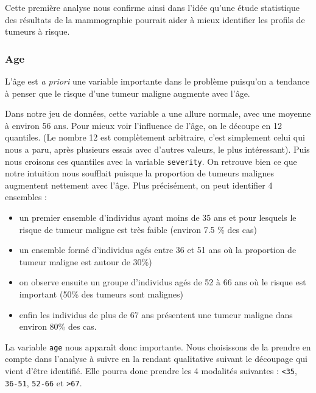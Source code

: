 \documentclass[a4paper]{report}
\begin{document}
Cette première analyse nous confirme ainsi dans l'idée qu'une étude statistique des résultats de la mammographie pourrait aider à mieux identifier les profils de tumeurs à risque.


\subsubsection{Age}
L'âge est \emph{a priori} une variable importante dans le problème puisqu'on a tendance à penser que le risque d'une tumeur maligne augmente avec l'âge.

Dans notre jeu de données, cette variable a une allure normale, avec une moyenne à environ 56 ans. Pour mieux voir l'influence de l'âge, on le découpe en 12 quantiles. (Le nombre 12 est complètement arbitraire, c'est simplement celui qui nous a paru, après plusieurs essais avec d'autres valeurs, le plus intéressant). Puis nous croisons ces quantiles avec la variable \verb|severity|. On retrouve bien ce que notre intuition nous soufflait puisque la proportion de tumeurs malignes augmentent nettement avec l'âge. Plus précisément, on peut identifier 4 ensembles :
\begin{itemize}
\item un premier ensemble d'individus ayant moins de 35 ans et pour lesquels le risque de tumeur maligne est très faible (environ 7.5 \% des cas)
\item un ensemble formé d'individus agés entre 36 et 51 ans où la proportion de tumeur maligne est autour de 30\%)
\item on observe ensuite un groupe d'individus agés de 52 à 66 ans où le risque est important (50\% des tumeurs sont malignes)
\item enfin les individus de plus de 67 ans présentent une tumeur maligne dans environ 80\% des cas.
\end{itemize} 

La variable \verb|age| nous apparaît donc importante. Nous choisissons de la prendre en compte dans l'analyse à suivre en la rendant qualitative suivant le découpage qui vient d'être identifié. Elle pourra donc prendre les 4 modalités suivantes : \verb|<35|, \verb|36-51|, \verb|52-66| et \verb|>67|.
\end{document}
